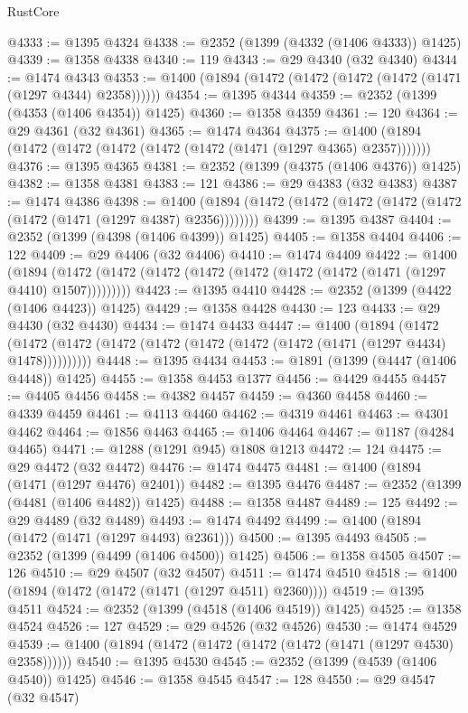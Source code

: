 \begin{lexlean}{RustCore}
\begin{coremodule}
@4333 := @1395 @4324
@4338 := @2352 (@1399 (@4332 (@1406 @4333)) @1425)
@4339 := @1358 @4338
@4340 := 119
@4343 := @29 @4340 (@32 @4340)
@4344 := @1474 @4343
@4353 := @1400 (@1894 (@1472 (@1472 (@1472 (@1472 (@1471 (@1297 @4344) @2358))))))
@4354 := @1395 @4344
@4359 := @2352 (@1399 (@4353 (@1406 @4354)) @1425)
@4360 := @1358 @4359
@4361 := 120
@4364 := @29 @4361 (@32 @4361)
@4365 := @1474 @4364
@4375 := @1400 (@1894 (@1472 (@1472 (@1472 (@1472 (@1472 (@1471 (@1297 @4365) @2357)))))))
@4376 := @1395 @4365
@4381 := @2352 (@1399 (@4375 (@1406 @4376)) @1425)
@4382 := @1358 @4381
@4383 := 121
@4386 := @29 @4383 (@32 @4383)
@4387 := @1474 @4386
@4398 := @1400 (@1894 (@1472 (@1472 (@1472 (@1472 (@1472 (@1472 (@1471 (@1297 @4387) @2356))))))))
@4399 := @1395 @4387
@4404 := @2352 (@1399 (@4398 (@1406 @4399)) @1425)
@4405 := @1358 @4404
@4406 := 122
@4409 := @29 @4406 (@32 @4406)
@4410 := @1474 @4409
@4422 := @1400
    (@1894 (@1472 (@1472 (@1472 (@1472 (@1472 (@1472 (@1472 (@1471 (@1297 @4410) @1507)))))))))
@4423 := @1395 @4410
@4428 := @2352 (@1399 (@4422 (@1406 @4423)) @1425)
@4429 := @1358 @4428
@4430 := 123
@4433 := @29 @4430 (@32 @4430)
@4434 := @1474 @4433
@4447 := @1400
    (@1894
      (@1472 (@1472 (@1472 (@1472 (@1472 (@1472 (@1472 (@1472 (@1471 (@1297 @4434) @1478))))))))))
@4448 := @1395 @4434
@4453 := @1891 (@1399 (@4447 (@1406 @4448)) @1425)
@4455 := @1358 @4453 @1377
@4456 := @4429 @4455
@4457 := @4405 @4456
@4458 := @4382 @4457
@4459 := @4360 @4458
@4460 := @4339 @4459
@4461 := @4113 @4460
@4462 := @4319 @4461
@4463 := @4301 @4462
@4464 := @1856 @4463
@4465 := @1406 @4464
@4467 := @1187 (@4284 @4465)
@4471 := @1288 (@1291 @945) @1808 @1213
@4472 := 124
@4475 := @29 @4472 (@32 @4472)
@4476 := @1474 @4475
@4481 := @1400 (@1894 (@1471 (@1297 @4476) @2401))
@4482 := @1395 @4476
@4487 := @2352 (@1399 (@4481 (@1406 @4482)) @1425)
@4488 := @1358 @4487
@4489 := 125
@4492 := @29 @4489 (@32 @4489)
@4493 := @1474 @4492
@4499 := @1400 (@1894 (@1472 (@1471 (@1297 @4493) @2361)))
@4500 := @1395 @4493
@4505 := @2352 (@1399 (@4499 (@1406 @4500)) @1425)
@4506 := @1358 @4505
@4507 := 126
@4510 := @29 @4507 (@32 @4507)
@4511 := @1474 @4510
@4518 := @1400 (@1894 (@1472 (@1472 (@1471 (@1297 @4511) @2360))))
@4519 := @1395 @4511
@4524 := @2352 (@1399 (@4518 (@1406 @4519)) @1425)
@4525 := @1358 @4524
@4526 := 127
@4529 := @29 @4526 (@32 @4526)
@4530 := @1474 @4529
@4539 := @1400 (@1894 (@1472 (@1472 (@1472 (@1472 (@1471 (@1297 @4530) @2358))))))
@4540 := @1395 @4530
@4545 := @2352 (@1399 (@4539 (@1406 @4540)) @1425)
@4546 := @1358 @4545
@4547 := 128
@4550 := @29 @4547 (@32 @4547)

\end{coremodule}
\end{lexlean}
